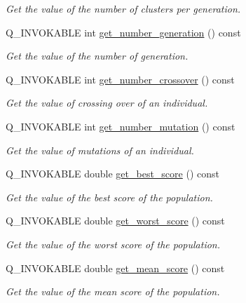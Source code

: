\begin{DoxyCompactItemize}
\begin{DoxyCompactList}\small\item\em Get the value of the number of clusters per generation. \end{DoxyCompactList}\item 
Q\+\_\+\+I\+N\+V\+O\+K\+A\+B\+LE int \hyperlink{class_population_table_model_a5070a313337e4a25eac3f2583c1cda3c}{get\+\_\+number\+\_\+generation} () const
\begin{DoxyCompactList}\small\item\em Get the value of the number of generation. \end{DoxyCompactList}\item 
Q\+\_\+\+I\+N\+V\+O\+K\+A\+B\+LE int \hyperlink{class_population_table_model_a32531e283e3bc76f01139bc0a90519e6}{get\+\_\+number\+\_\+crossover} () const
\begin{DoxyCompactList}\small\item\em Get the value of crossing over of an individual. \end{DoxyCompactList}\item 
Q\+\_\+\+I\+N\+V\+O\+K\+A\+B\+LE int \hyperlink{class_population_table_model_a0ead9e7e42e6a143a30367cdf990919c}{get\+\_\+number\+\_\+mutation} () const
\begin{DoxyCompactList}\small\item\em Get the value of mutations of an individual. \end{DoxyCompactList}\item 
Q\+\_\+\+I\+N\+V\+O\+K\+A\+B\+LE double \hyperlink{class_population_table_model_abdfe03036ec57576de96f5b95893d147}{get\+\_\+best\+\_\+score} () const
\begin{DoxyCompactList}\small\item\em Get the value of the best score of the population. \end{DoxyCompactList}\item 
Q\+\_\+\+I\+N\+V\+O\+K\+A\+B\+LE double \hyperlink{class_population_table_model_a41c9b5e0e1dba64fcfadf53320dc0572}{get\+\_\+worst\+\_\+score} () const
\begin{DoxyCompactList}\small\item\em Get the value of the worst score of the population. \end{DoxyCompactList}\item 
Q\+\_\+\+I\+N\+V\+O\+K\+A\+B\+LE double \hyperlink{class_population_table_model_a754817f10ac37e0a7d6fc5c216908603}{get\+\_\+mean\+\_\+score} () const
\begin{DoxyCompactList}\small\item\em Get the value of the mean score of the population. \end{DoxyCompactList}\end{DoxyCompactItemize}
